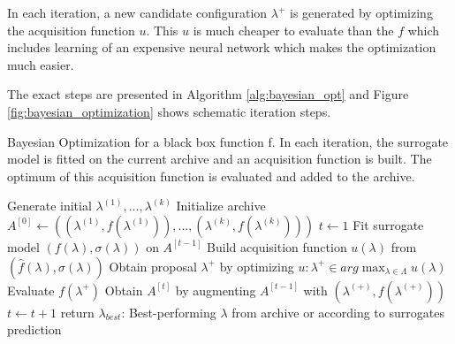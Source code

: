 In each iteration, a new candidate configuration $ \lambda^+ $  is generated by optimizing the acquisition function $ u $. This $ u $ is much cheaper to evaluate than the $ f $ which includes learning of an expensive neural network which makes the optimization much easier.

The exact steps are presented in Algorithm \ref{alg:bayesian_opt} and Figure \ref{fig:bayesian_optimization} shows schematic iteration steps.

\begin{algorithm}[H]
	\caption{Bayesian Optimization for a black box function f. In each iteration, the surrogate model is fitted on the current archive and an acquisition function is built. The optimum of this acquisition function is evaluated and added to the archive.}
	\label{alg:bayesian_opt}
	\begin{algorithmic}
		\State Generate initial $\lambda^{(1)}, ..., \lambda^{(k)} $
		\State Initialize archive $A^{[0]} \gets \left(\left(\lambda^{(1)}, f\left(\lambda^{(1)}\right)\right), ..., \left(\lambda^{(k)}, f\left(\lambda^{(k)}\right)\right)\right)$
		\State $ t \gets 1 $ 
			\State Fit surrogate model $ \left(f(\lambda), \sigma(\lambda)\right) $ on $ A^{[t-1]} $
			\State Build acquisition function $ u(\lambda) $ from $ \left(\hat{f}\left(\lambda\right), \sigma(\lambda)\right) $
			\State Obtain proposal $ \lambda^{+} $ by optimizing $ u: \lambda^+ \in arg\max_{\lambda \in \Lambda} u(\lambda) $
			\State Evaluate $ f\left(\lambda^+\right)$
			\State Obtain $A^[t]$ by augmenting $ A^{[t-1]} $ with $ \left(\lambda^{(+)}, f\left(\lambda^{(+)}\right)\right) $
			\State $ t \gets t+1 $
		\EndWhile
		\State return $ \lambda_{best} $: Best-performing $\lambda$ from archive or according to surrogates prediction
	\end{algorithmic}
\end{algorithm}

